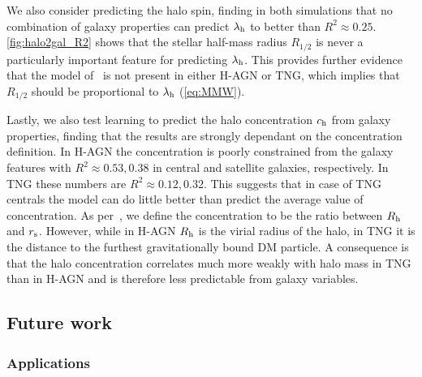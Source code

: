 \documentclass[useAMS,usenatbib]{mnras}
\begin{document}
We also consider predicting the halo spin, finding in both simulations that no combination of galaxy properties can predict $\lambda_{\rm h}$ to better than $R^2 \approx 0.25$. \cref{fig:halo2gal_R2} shows that the stellar half-mass radius $R_{1/2}$ is never a particularly important feature for predicting $\lambda_{\rm h}$. This provides further evidence that the model of~\citealt{MMW_1998} is not present in either H-AGN or TNG, which implies that $R_{1/2}$ should be proportional to $\lambda_{\rm h}$ (\cref{eq:MMW}).

Lastly, we also test learning to predict the halo concentration $c_{\rm h}$ from galaxy properties, finding that the results are strongly dependant on the concentration definition. In H-AGN the concentration is poorly constrained from the galaxy features with $R^2 \approx 0.53, 0.38$ in central and satellite galaxies, respectively. In TNG these numbers are $R^2\approx0.12, 0.32$. This suggests that in case of TNG centrals the model can do little better than predict the average value of concentration. As per~, we define the concentration to be the ratio between $R_{\rm h}$ and $r_{\rm s}$. However, while in H-AGN $R_{\rm h}$ is the virial radius of the halo, in TNG it is the distance to the furthest gravitationally bound \ac{DM} particle. A consequence is that the halo concentration correlates much more weakly with halo mass in TNG than in H-AGN and is therefore less predictable from galaxy variables.

\subsection{Future work}\label{sec:future}

\subsubsection{Applications}
\end{document}
